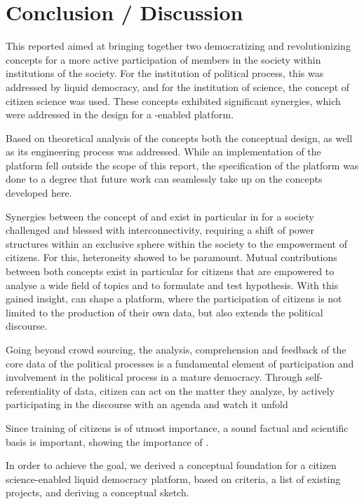 \chapter{Conclusion / Discussion}
\label{ch:Conclusion}

This reported aimed at bringing together two democratizing and revolutionizing concepts for a more active participation of members in the society within institutions of the society. For the institution of political process, this was addressed by liquid democracy, and for the institution of science, the concept of citizen science was used. These concepts exhibited significant synergies, which were addressed in the design for a -enabled  platform. 

Based on theoretical analysis of the concepts both the conceptual design, as well as its engineering process was addressed. While an implementation of the platform fell outside the scope of this report, the specification of the platform was done to a degree that future work can seamlessly take up on the concepts developed here. 

Synergies between the concept of  and  exist in particular in for a society challenged and blessed with interconnectivity, requiring a shift of power structures within an exclusive sphere within the society to the empowerment of citizens. For this, heteroneity showed to be paramount. 
Mutual contributions between both concepts exist in particular for citizens that are empowered to analyse a wide field of topics and to formulate and test hypothesis. With this gained insight,  can shape a  platform, where the participation of citizens is not limited to the production of their own data, but also extends the political discourse.

Going beyond crowd sourcing, the analysis, comprehension and feedback of the core data of the political processes is a fundamental element of participation and involvement in the political process in a mature democracy. 
Through self-referentiality of data, citizen  can act on the matter they analyze, by actively participating in the discourse with an agenda and watch it unfold

Since training of citizens is of utmost importance, a sound factual and scientific basis is important, showing the importance of .

In order to achieve the goal, we derived a conceptual foundation for a citizen science-enabled liquid democracy platform, based on criteria, a list of existing projects, and deriving a conceptual sketch.

